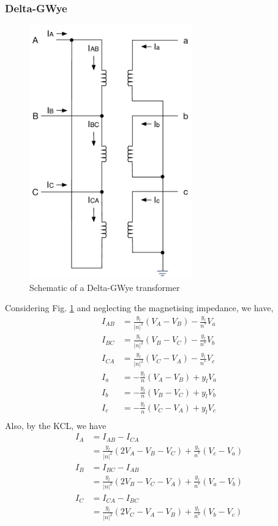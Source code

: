 \documentclass[10pt]{article}
\begin{document}
\subsubsection{Delta-GWye}
\begin{figure}
\begin{center}
\includegraphics[width=7cm]{DeltaGWye.pdf}
\caption{Schematic of a Delta-GWye transformer}
\label{FIG_DELTA_GWYE}
\end{center}
\end{figure}
Considering Fig. \ref{FIG_DELTA_GWYE} and neglecting the magnetising impedance, we have,
\begin{align}
I_{AB} &= \frac{y_l}{|n|^2}(V_A - V_B) - \frac{y_l}{n^*}V_a \\
I_{BC} &= \frac{y_l}{|n|^2}(V_B - V_C) - \frac{y_l}{n^*}V_b \\
I_{CA} &= \frac{y_l}{|n|^2}(V_C - V_A) - \frac{y_l}{n^*}V_c \\
I_a &= -\frac{y_l}{n}(V_A - V_B) + y_l V_a \\
I_b &= -\frac{y_l}{n}(V_B - V_C) + y_l V_b \\
I_c &= -\frac{y_l}{n}(V_C - V_A) + y_l V_c \\
\end{align}
Also, by the KCL, we have
\begin{align}
I_A &= I_{AB} - I_{CA} \\
&= \frac{y_l}{|n|^2}(2V_A - V_B - V_C) + \frac{y_l}{n^*}(V_c - V_a) \\
I_B &= I_{BC} - I_{AB} \\
&= \frac{y_l}{|n|^2}(2V_B - V_C - V_A) + \frac{y_l}{n^*}(V_a - V_b) \\
I_C &= I_{CA} - I_{BC} \\
&= \frac{y_l}{|n|^2}(2V_C - V_A - V_B) + \frac{y_l}{n^*}(V_b - V_c)
\end{align}
\end{document}
